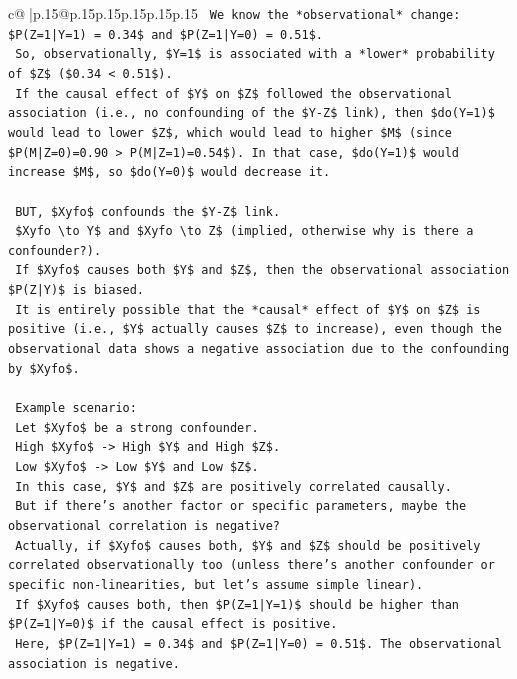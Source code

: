 \documentclass{article}
\begin{document}
{\begin{supertabular}{c@{$\;$}|p{.15\linewidth}@{}p{.15\linewidth}p{.15\linewidth}p{.15\linewidth}p{.15\linewidth}p{.15\linewidth}}
{{{\texttt{    We know the *observational* change: \$P(Z=1|Y=1) = 0.34\$ and \$P(Z=1|Y=0) = 0.51\$.} \\
\texttt{    So, observationally, \$Y=1\$ is associated with a *lower* probability of \$Z\$ (\$0.34 < 0.51\$).} \\
\texttt{    If the causal effect of \$Y\$ on \$Z\$ followed the observational association (i.e., no confounding of the \$Y{-}Z\$ link), then \$do(Y=1)\$ would lead to lower \$Z\$, which would lead to higher \$M\$ (since \$P(M|Z=0)=0.90 > P(M|Z=1)=0.54\$). In that case, \$do(Y=1)\$ would increase \$M\$, so \$do(Y=0)\$ would decrease it.} \\
\\ 
\texttt{    BUT, \$Xyfo\$ confounds the \$Y{-}Z\$ link.} \\
\texttt{    \$Xyfo \textbackslash{}to Y\$ and \$Xyfo \textbackslash{}to Z\$ (implied, otherwise why is there a confounder?).} \\
\texttt{    If \$Xyfo\$ causes both \$Y\$ and \$Z\$, then the observational association \$P(Z|Y)\$ is biased.} \\
\texttt{    It is entirely possible that the *causal* effect of \$Y\$ on \$Z\$ is positive (i.e., \$Y\$ actually causes \$Z\$ to increase), even though the observational data shows a negative association due to the confounding by \$Xyfo\$.} \\
\\ 
\texttt{    Example scenario:} \\
\texttt{    Let \$Xyfo\$ be a strong confounder.} \\
\texttt{    High \$Xyfo\$ {-}> High \$Y\$ and High \$Z\$.} \\
\texttt{    Low \$Xyfo\$ {-}> Low \$Y\$ and Low \$Z\$.} \\
\texttt{    In this case, \$Y\$ and \$Z\$ are positively correlated causally.} \\
\texttt{    But if there's another factor or specific parameters, maybe the observational correlation is negative?} \\
\texttt{    Actually, if \$Xyfo\$ causes both, \$Y\$ and \$Z\$ should be positively correlated observationally too (unless there's another confounder or specific non{-}linearities, but let's assume simple linear).} \\
\texttt{    If \$Xyfo\$ causes both, then \$P(Z=1|Y=1)\$ should be higher than \$P(Z=1|Y=0)\$ if the causal effect is positive.} \\
\texttt{    Here, \$P(Z=1|Y=1) = 0.34\$ and \$P(Z=1|Y=0) = 0.51\$. The observational association is negative.} \\
}}}
\end{supertabular}}
\end{document}

